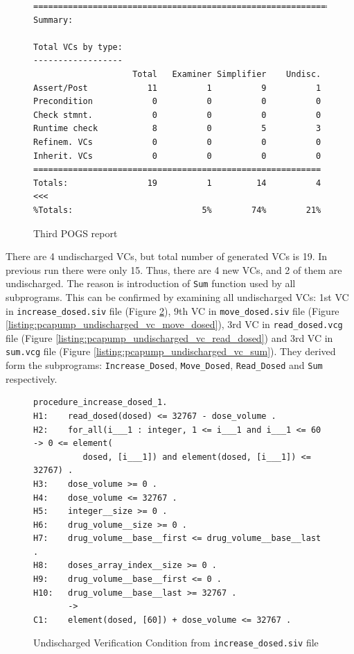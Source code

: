 \begin{figure}
\begin{lstlisting}[frame=single, gobble=0]
===============================================================================
Summary:

Total VCs by type:
------------------
                    Total   Examiner Simplifier    Undisc.
Assert/Post            11          1          9          1
Precondition            0          0          0          0
Check stmnt.            0          0          0          0
Runtime check           8          0          5          3
Refinem. VCs            0          0          0          0
Inherit. VCs            0          0          0          0
==========================================================
Totals:                19          1         14          4 <<<
%Totals:                          5%        74%        21%
\end{lstlisting}
\doublespacing
\caption{Third POGS report}
\label{listing:pcapump_dosemonitor_pogs3}
\end{figure}

There are 4 undischarged VCs, but total number of generated VCs is 19. In previous run there were only 15. Thus, there are 4 new VCs, and 2 of them are undischarged. The reason is introduction of \lstinline{Sum} function used by all subprograms. This can be confirmed by examining all undischarged VCs: 1st VC in \lstinline{increase_dosed.siv} file (Figure \ref{listing:pcapump_undischarged_vc_increase_dosed}), 9th VC in \lstinline{move_dosed.siv} file (Figure \ref{listing:pcapump_undischarged_vc_move_dosed}), 3rd VC in \lstinline{read_dosed.vcg} file (Figure \ref{listing:pcapump_undischarged_vc_read_dosed}) and 3rd VC in \lstinline{sum.vcg} file (Figure \ref{listing:pcapump_undischarged_vc_sum}). They derived form the subprograms: \lstinline{Increase_Dosed}, \lstinline{Move_Dosed}, \lstinline{Read_Dosed} and \lstinline{Sum} respectively.

\begin{figure}
\singlespacing
\begin{lstlisting}[frame=single, gobble=0]
procedure_increase_dosed_1.
H1:    read_dosed(dosed) <= 32767 - dose_volume .
H2:    for_all(i___1 : integer, 1 <= i___1 and i___1 <= 60 -> 0 <= element(
          dosed, [i___1]) and element(dosed, [i___1]) <= 32767) .
H3:    dose_volume >= 0 .
H4:    dose_volume <= 32767 .
H5:    integer__size >= 0 .
H6:    drug_volume__size >= 0 .
H7:    drug_volume__base__first <= drug_volume__base__last .
H8:    doses_array_index__size >= 0 .
H9:    drug_volume__base__first <= 0 .
H10:   drug_volume__base__last >= 32767 .
       ->
C1:    element(dosed, [60]) + dose_volume <= 32767 .
\end{lstlisting}
\doublespacing
\caption{Undischarged Verification Condition from \lstinline{increase_dosed.siv} file}
\label{listing:pcapump_undischarged_vc_increase_dosed}
\end{figure}

